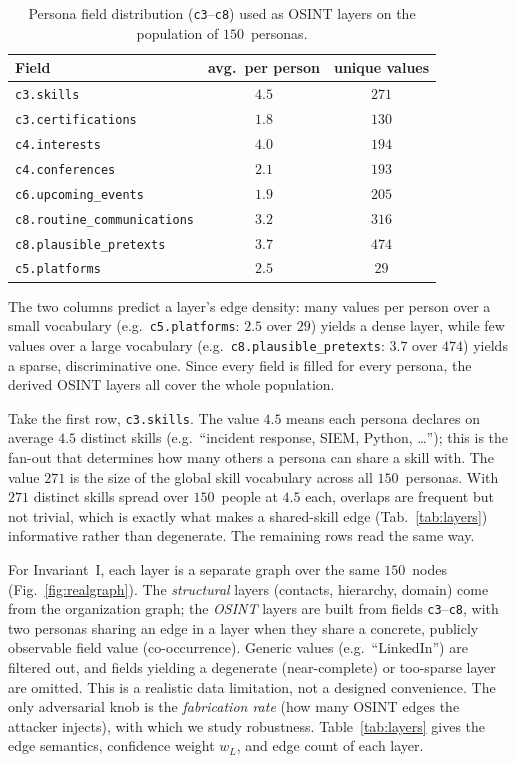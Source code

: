 \begin{table}[h]\centering\small
\begin{tabular}{lcc}
\toprule
\textbf{Field} & \textbf{avg.\ per person} & \textbf{unique values} \\
\midrule
\texttt{c3.skills} & $4.5$ & $271$ \\
\texttt{c3.certifications} & $1.8$ & $130$ \\
\texttt{c4.interests} & $4.0$ & $194$ \\
\texttt{c4.conferences} & $2.1$ & $193$ \\
\texttt{c6.upcoming\_events} & $1.9$ & $205$ \\
\texttt{c8.routine\_communications} & $3.2$ & $316$ \\
\texttt{c8.plausible\_pretexts} & $3.7$ & $474$ \\
\texttt{c5.platforms} & $2.5$ & $29$ \\
\bottomrule
\end{tabular}
\caption{Persona field distribution (\texttt{c3}--\texttt{c8}) used as OSINT layers on the population of
$150$~personas.}
\label{tab:fielddist}
\end{table}

\noindent The two columns predict a layer's edge density: many values per person over a small vocabulary
(e.g.\ \texttt{c5.platforms}: $2.5$ over $29$) yields a dense layer, while few values over a large vocabulary
(e.g.\ \texttt{c8.plausible\_pretexts}: $3.7$ over $474$) yields a sparse, discriminative one. Since every field
is filled for every persona, the derived OSINT layers all cover the whole population.

\noindent Take the first row, \texttt{c3.skills}. The value $4.5$ means each persona
declares on average $4.5$ distinct skills (e.g.\ ``incident response, SIEM, Python, \dots''); this is the
fan-out that determines how many others a persona can share a skill with. The value $271$ is the size of the
global skill vocabulary across all $150$~personas. With $271$ distinct skills spread over $150$~people at $4.5$
each, overlaps are frequent but not trivial, which is exactly what makes a shared-skill edge
(Tab.~\ref{tab:layers}) informative rather than degenerate. The remaining rows read the same way.

For Invariant~I, each layer is a separate graph over the same $150$~nodes
(Fig.~\ref{fig:realgraph}). The \emph{structural} layers (contacts, hierarchy, domain) come from the organization
graph; the \emph{OSINT} layers are built from fields \texttt{c3}--\texttt{c8}, with two personas sharing an edge in a
layer when they share a concrete, publicly observable field value (co-occurrence). Generic values (e.g.\ ``LinkedIn'') are filtered out, and fields yielding a degenerate (near-complete) or too-sparse layer are omitted. This is a realistic data limitation, not a designed convenience. The only adversarial knob is the \emph{fabrication
rate} (how many OSINT edges the attacker injects), with which we study robustness. Table~\ref{tab:layers} gives
the edge semantics, confidence weight $w_L$, and edge count of each layer.

